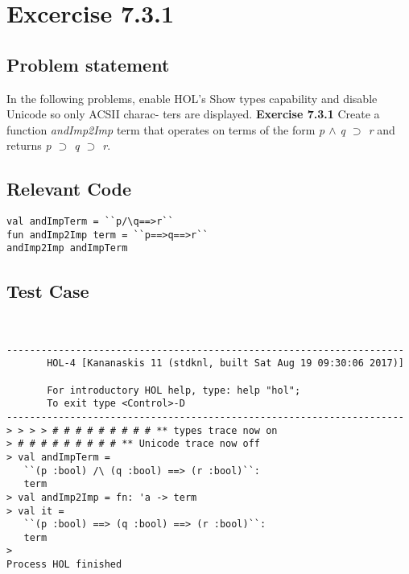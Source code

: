 \documentclass{report}
\begin{document}
\chapter{Excercise 7.3.1}
\label{cha:7.3.1}

\section{Problem statement}
\label{problem-statement-7-3-1}
In the following problems, enable HOL’s Show types capability and disable Unicode so only ACSII charac-
ters are displayed.
\textbf{Exercise 7.3.1} Create a function \emph{andImp2Imp} term that operates on terms of the form \emph{p $\land$ q $\supset$ r} and returns \emph{p $\supset$ q $\supset$ r}.

\section{Relevant Code}
\label{rel-code-7-3-1}
\begin{lstlisting}[frame=TBlr]
val andImpTerm = ``p/\q==>r``
fun andImp2Imp term = ``p==>q==>r``
andImp2Imp andImpTerm
\end{lstlisting}

\section{Test Case}
\label{test-results-7-3-1}

\begin{session}
  \begin{scriptsize}
\begin{verbatim}


---------------------------------------------------------------------
       HOL-4 [Kananaskis 11 (stdknl, built Sat Aug 19 09:30:06 2017)]

       For introductory HOL help, type: help "hol";
       To exit type <Control>-D
---------------------------------------------------------------------
> > > > # # # # # # # # # ** types trace now on
> # # # # # # # # # ** Unicode trace now off
> val andImpTerm =
   ``(p :bool) /\ (q :bool) ==> (r :bool)``:
   term
> val andImp2Imp = fn: 'a -> term
> val it =
   ``(p :bool) ==> (q :bool) ==> (r :bool)``:
   term
> 
Process HOL finished

\end{verbatim}
  \end{scriptsize}
\end{session}
\end{document}
